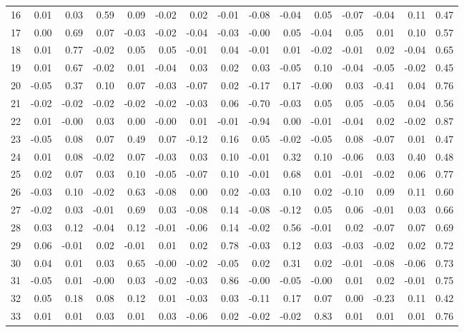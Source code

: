 \documentclass{article}
\begin{document}
\begin{table}[ht]
{\begin{tabular}{rrrrrrrrrrrrrrr}
  16 & 0.01 & 0.03 & 0.59 & 0.09 & -0.02 & 0.02 & -0.01 & -0.08 & -0.04 & 0.05 & -0.07 & -0.04 & 0.11 & 0.47 \\ 
  17 & 0.00 & 0.69 & 0.07 & -0.03 & -0.02 & -0.04 & -0.03 & -0.00 & 0.05 & -0.04 & 0.05 & 0.01 & 0.10 & 0.57 \\ 
  18 & 0.01 & 0.77 & -0.02 & 0.05 & 0.05 & -0.01 & 0.04 & -0.01 & 0.01 & -0.02 & -0.01 & 0.02 & -0.04 & 0.65 \\ 
  19 & 0.01 & 0.67 & -0.02 & 0.01 & -0.04 & 0.03 & 0.02 & 0.03 & -0.05 & 0.10 & -0.04 & -0.05 & -0.02 & 0.45 \\ 
  20 & -0.05 & 0.37 & 0.10 & 0.07 & -0.03 & -0.07 & 0.02 & -0.17 & 0.17 & -0.00 & 0.03 & -0.41 & 0.04 & 0.76 \\ 
  21 & -0.02 & -0.02 & -0.02 & -0.02 & -0.02 & -0.03 & 0.06 & -0.70 & -0.03 & 0.05 & 0.05 & -0.05 & 0.04 & 0.56 \\ 
  22 & 0.01 & -0.00 & 0.03 & 0.00 & -0.00 & 0.01 & -0.01 & -0.94 & 0.00 & -0.01 & -0.04 & 0.02 & -0.02 & 0.87 \\ 
  23 & -0.05 & 0.08 & 0.07 & 0.49 & 0.07 & -0.12 & 0.16 & 0.05 & -0.02 & -0.05 & 0.08 & -0.07 & 0.01 & 0.47 \\ 
  24 & 0.01 & 0.08 & -0.02 & 0.07 & -0.03 & 0.03 & 0.10 & -0.01 & 0.32 & 0.10 & -0.06 & 0.03 & 0.40 & 0.48 \\ 
  25 & 0.02 & 0.07 & 0.03 & 0.10 & -0.05 & -0.07 & 0.10 & -0.01 & 0.68 & 0.01 & -0.01 & -0.02 & 0.06 & 0.77 \\ 
  26 & -0.03 & 0.10 & -0.02 & 0.63 & -0.08 & 0.00 & 0.02 & -0.03 & 0.10 & 0.02 & -0.10 & 0.09 & 0.11 & 0.60 \\ 
  27 & -0.02 & 0.03 & -0.01 & 0.69 & 0.03 & -0.08 & 0.14 & -0.08 & -0.12 & 0.05 & 0.06 & -0.01 & 0.03 & 0.66 \\ 
  28 & 0.03 & 0.12 & -0.04 & 0.12 & -0.01 & -0.06 & 0.14 & -0.02 & 0.56 & -0.01 & 0.02 & -0.07 & 0.07 & 0.69 \\ 
  29 & 0.06 & -0.01 & 0.02 & -0.01 & 0.01 & 0.02 & 0.78 & -0.03 & 0.12 & 0.03 & -0.03 & -0.02 & 0.02 & 0.72 \\ 
  30 & 0.04 & 0.01 & 0.03 & 0.65 & -0.00 & -0.02 & -0.05 & 0.02 & 0.31 & 0.02 & -0.01 & -0.08 & -0.06 & 0.73 \\ 
  31 & -0.05 & 0.01 & -0.00 & 0.03 & -0.02 & -0.03 & 0.86 & -0.00 & -0.05 & -0.00 & 0.01 & 0.02 & -0.01 & 0.75 \\ 
  32 & 0.05 & 0.18 & 0.08 & 0.12 & 0.01 & -0.03 & 0.03 & -0.11 & 0.17 & 0.07 & 0.00 & -0.23 & 0.11 & 0.42 \\ 
  33 & 0.01 & 0.01 & 0.03 & 0.01 & 0.03 & -0.06 & 0.02 & -0.02 & -0.02 & 0.83 & 0.01 & 0.01 & 0.01 & 0.76 \\ 

\end{tabular}}
\end{table}
\end{document}
